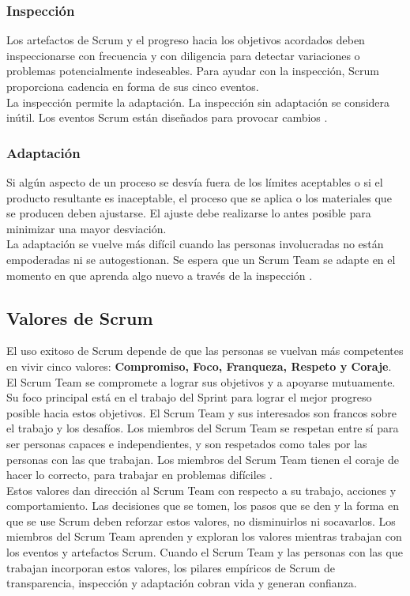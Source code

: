\begin{spacing}{1.5}
		\subsubsection{Inspecci\'{o}n}
			Los artefactos de Scrum y el progreso hacia los objetivos acordados deben inspeccionarse con
			frecuencia y con diligencia para detectar variaciones o problemas potencialmente indeseables. Para
			ayudar con la inspección, Scrum proporciona cadencia en forma de sus cinco eventos.\\
			La inspección permite la adaptación. La inspección sin adaptación se considera inútil. Los eventos Scrum
			están diseñados para provocar cambios \cite{chap2_scrum}.
		\subsubsection{Adaptaci\'{o}n}
			Si algún aspecto de un proceso se desvía fuera de los límites aceptables o si el producto resultante es
			inaceptable, el proceso que se aplica o los materiales que se producen deben ajustarse. El ajuste debe
			realizarse lo antes posible para minimizar una mayor desviación.\\
			La adaptación se vuelve más difícil cuando las personas involucradas no están empoderadas ni se
			autogestionan. Se espera que un Scrum Team se adapte en el momento en que aprenda algo nuevo a
			través de la inspección \cite{chap2_scrum}.
	\subsection{Valores de Scrum}
			El uso exitoso de Scrum depende de que las personas se vuelvan más competentes en vivir cinco valores: \textbf{Compromiso, Foco, Franqueza, Respeto y Coraje}.
			El Scrum Team se compromete a lograr sus objetivos y a apoyarse mutuamente. Su foco principal está
			en el trabajo del Sprint para lograr el mejor progreso posible hacia estos objetivos. El Scrum Team y sus interesados son francos sobre el trabajo y los desafíos. Los miembros del Scrum Team se respetan entre sí para ser personas capaces e independientes, y son respetados como tales por las personas con las que	trabajan. Los miembros del Scrum Team tienen el coraje de hacer lo correcto, para trabajar en
			problemas difíciles \cite{chap2_scrum}.\\
			Estos valores dan dirección al Scrum Team con respecto a su trabajo, acciones y comportamiento. Las
			decisiones que se tomen, los pasos que se den y la forma en que se use Scrum deben reforzar estos
			valores, no disminuirlos ni socavarlos. Los miembros del Scrum Team aprenden y exploran los valores
			mientras trabajan con los eventos y artefactos Scrum. Cuando el Scrum Team y las personas con las que trabajan incorporan estos valores, los pilares empíricos de Scrum de transparencia, inspección y 		adaptación cobran vida y generan confianza.

\end{spacing}
